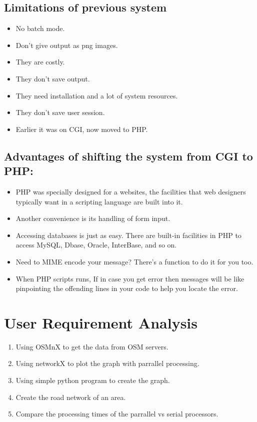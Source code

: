 \subsection{Limitations of previous system }
\begin{itemize}
\item No batch mode. 

\item Don't give output as png images.

\item They are costly.

\item They don't save output.

\item They need installation and a lot of system resources. 

\item They don't save user session.

\item Earlier it was on CGI, now moved to PHP. 
\end{itemize}
\subsection{Advantages of shifting the system from CGI to PHP:}
\begin{itemize}
\item PHP was specially designed for a websites, the facilities that web designers typically want in a scripting language are built into it.
\item Another convenience is its handling of form input.
\item Accessing databases is just as easy. There are built-in facilities in PHP to access MySQL, Dbase, Oracle, InterBase, and so on.
\item Need to MIME encode your message? There's a function to do it for you too.
\item When PHP scripts runs, If in case  you get error then messages will be like pinpointing the offending lines in your code to help you locate the error.
\end{itemize} 
\section{User Requirement Analysis}
\begin{enumerate}
	\item Using OSMnX to get the data from OSM servers.
	\item Using networkX to plot the graph with parrallel processing.
	\item Using simple python program to create the graph. 
	\item Create the road network of an area.
	\item Compare the processing times of the parrallel vs serial processors. 
\end{enumerate}